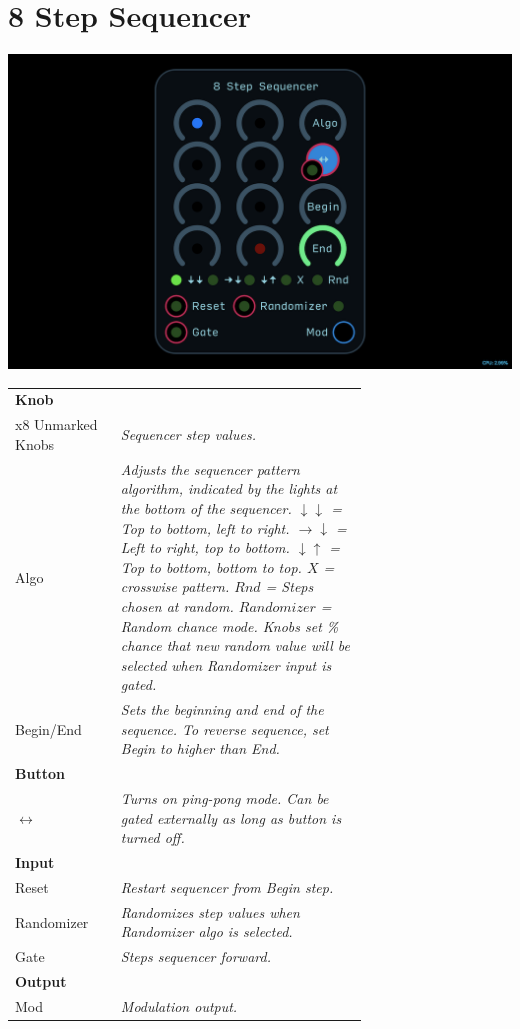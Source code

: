 \documentclass[11pt]{book}
\begin{document}
\pagebreak


\section{8 Step Sequencer}

\includegraphics[width=\textwidth]{8-step-sequencer.png}

\begin{table}[ht]
\small
\sffamily
\renewcommand\arraystretch{1.5}
\centering
\begin{tabular}{l*{1}{>{\raggedright\arraybackslash}p{0.7\linewidth}}}

\toprule
\textbf{Knob} \\
x8 Unmarked Knobs & \textit{Sequencer step values.} \\
Algo & \textit{Adjusts the sequencer pattern algorithm, indicated by the lights at the bottom of the sequencer. $\downarrow \downarrow$ = Top to bottom, left to right. $\rightarrow \downarrow$ = Left to right, top to bottom. $\downarrow \uparrow$ = Top to bottom, bottom to top. $X$ = crosswise pattern. $Rnd$ = Steps chosen at random. $Randomizer$ = Random chance mode. Knobs set \% chance that new random value will be selected when Randomizer input is gated.} \\
Begin/End & \textit{Sets the beginning and end of the sequence. To reverse sequence, set Begin to higher than End.} \\

\midrule
\textbf{Button} \\
$\leftrightarrow$ & \textit{Turns on ping-pong mode. Can be gated externally as long as button is turned off.} \\

\midrule
\textbf{Input} \\
Reset & \textit{Restart sequencer from Begin step.} \\
Randomizer & \textit{Randomizes step values when Randomizer algo is selected.} \\
Gate & \textit{Steps sequencer forward.} \\

\midrule
\textbf{Output} \\
Mod & \textit{Modulation output.} \\

\bottomrule
\end{tabular}
\end{table}%
\end{document}
